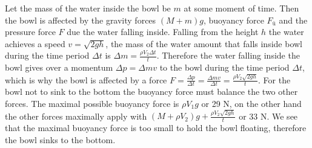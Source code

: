 \solueng
Let the mass of the water inside the bowl be $m$ at some moment of time. Then the bowl is affected by the gravity forces $(M+m)g$, buoyancy force $F_{ü}$ and the pressure force $F$ due the water falling inside. Falling from the height $h$ the water achieves a speed $v=\sqrt{2gh}$, the mass of the water amount that falls inside bowl during the time period $\Delta t$ is $\Delta m = \frac{\rho V_2 \Delta t}{t}$. Therefore the water falling inside the bowl gives over a momentum $\Delta p =\Delta m v$ to the bowl during the time period $\Delta t$, which is why the bowl is affected by a force $F=\frac{\Delta p}{\Delta t}=\frac{\Delta m v}{\Delta t}=\frac{\rho V_2 \sqrt{2gh}}{t}$. For the bowl not to sink to the bottom the buoyancy force must balance the two other forces. The maximal possible buoyancy force is $\rho V_1 g$ or 29 N, on the other hand the other forces maximally apply with $(M+\rho V_2)g + \frac{\rho V_2 \sqrt{2gh}}{t}$ or 33 N. We see that the maximal buoyancy force is too small to hold the bowl floating, therefore the bowl sinks to the bottom.
\probend